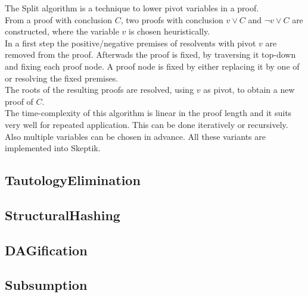 \documentclass{llncs}
\begin{document}
The Split \cite{CottonSplit} algorithm is a technique to lower pivot variables in a proof.\\
From a proof with conclusion $C$, two proofs with conclusion $v \vee C$ and $\neg{v} \vee C$ are constructed,  where the variable $v$ is chosen heuristically.\\
In a first step the positive/negative premises of resolvents with pivot $v$ are removed from the proof.
Afterwads the proof is fixed, by traversing it top-down and fixing each proof node.
A proof node is fixed by either replacing it by one of or resolving the fixed premises.\\ %
The roots of the resulting proofs are resolved, using $v$ as pivot, to obtain a new proof of $C$.\\
The time-complexity of this algorithm is linear in the proof length %
and it suits very well for repeated application. This can be done iteratively or recursively. Also multiple variables can be chosen in advance. 
All these variants are implemented into Skeptik.

\subsection{TautologyElimination}

\subsection{StructuralHashing}

\subsection{DAGification}

\subsection{Subsumption}
\end{document}
